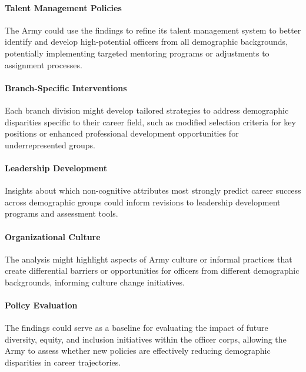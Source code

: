 \documentclass[../main.tex]{subfiles}
\begin{document}
\paragraph{Talent Management Policies} The Army could use the findings to refine its talent management system to better identify and develop high-potential officers from all demographic backgrounds, potentially implementing targeted mentoring programs or adjustments to assignment processes.

\paragraph{Branch-Specific Interventions} Each branch division might develop tailored strategies to address demographic disparities specific to their career field, such as modified selection criteria for key positions or enhanced professional development opportunities for underrepresented groups.

\paragraph{Leadership Development} Insights about which non-cognitive attributes most strongly predict career success across demographic groups could inform revisions to leadership development programs and assessment tools.

\paragraph{Organizational Culture} The analysis might highlight aspects of Army culture or informal practices that create differential barriers or opportunities for officers from different demographic backgrounds, informing culture change initiatives.

\paragraph{Policy Evaluation} The findings could serve as a baseline for evaluating the impact of future diversity, equity, and inclusion initiatives within the officer corps, allowing the Army to assess whether new policies are effectively reducing demographic disparities in career trajectories.
\end{document}

